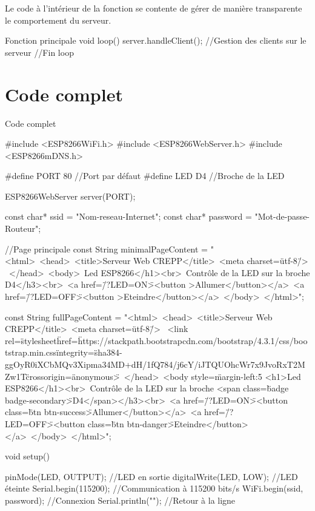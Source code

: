 Le code à l'intérieur de la fonction  se contente de gérer de manière transparente le comportement du serveur.
\begin{Cpp}{Fonction principale}
void loop() 
{
    server.handleClient(); //Gestion des clients sur le serveur
}//Fin loop
\end{Cpp}

\section{Code complet}
\begin{Cpp}{Code complet}

#include <ESP8266WiFi.h>
#include <ESP8266WebServer.h>
#include <ESP8266mDNS.h>
    
#define PORT 80 //Port par défaut
#define LED D4  //Broche de la LED
    
ESP8266WebServer server(PORT);
    
const char* ssid     = "Nom-reseau-Internet";
const char* password = "Mot-de-passe-Routeur";
    
//Page principale
const String minimalPageContent = "<html>\
<head>\
    <title>Serveur Web CREPP</title>\
    <meta charset=\"utf-8\"/> \
    </head>\
    <body>\
    <h1>Led ESP8266</h1><br>\
        <h3>Contrôle de la LED sur la broche D4</h3><br>\
          <a href=\"/?LED=ON\"><button >Allumer</button></a>\
          <a href=\"/?LED=OFF\"><button >Eteindre</button></a>\
      </body>\
    </html>";
    
    const String fullPageContent = "<html>\
      <head>\
        <title>Serveur Web CREPP</title>\
        <meta charset=\"utf-8\"/> \
        <link rel=\"stylesheet\" href=\"https://stackpath.bootstrapcdn.com/bootstrap/4.3.1/css/bootstrap.min.css\" integrity=\"sha384-ggOyR0iXCbMQv3Xipma34MD+dH/1fQ784/j6cY/iJTQUOhcWr7x9JvoRxT2MZw1T\" crossorigin=\"anonymous\">\
      </head>\
      <body style=\"margin-left:5%
        <h1>Led ESP8266</h1><br>\
        <h3>Contrôle de la LED sur la broche <span class=\"badge badge-secondary\">D4</span></h3><br>\
          <a href=\"/?LED=ON\"><button class=\"btn btn-success\">Allumer</button></a>\
          <a href=\"/?LED=OFF\"><button class=\"btn btn-danger\">Eteindre</button></a>\
      </body>\
    </html>";
    
    
void setup() {
      
    pinMode(LED, OUTPUT);       //LED en sortie
    digitalWrite(LED, LOW);     //LED éteinte
    Serial.begin(115200);       //Communication à 115200 bits/s
    WiFi.begin(ssid, password); //Connexion
    Serial.println("");         //Retour à la ligne
    
}
\end{Cpp}
